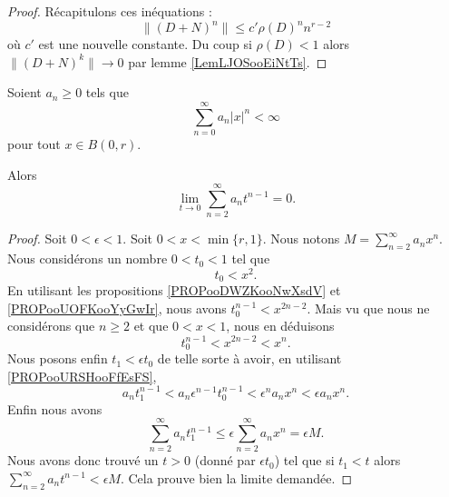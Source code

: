 \begin{proof}
	Récapitulons ces inéquations :
	\begin{equation}
		\| (D+N)^n \|\leq c'\rho(D)^nn^{r-2}
	\end{equation}
	où \( c'\) est une nouvelle constante. Du coup si \( \rho(D)<1\) alors \( \| (D+N)^k \|\to 0\) par lemme \ref{LemLJOSooEiNtTs}.
\end{proof}




\begin{lemma}	\label{LEMooZWXGooQkgsqw}
	Soient \( a_n\geq 0\) tels que
	\begin{equation}
		\sum_{n=0}^{\infty}a_n| x |^n<\infty
	\end{equation}
	pour tout \( x\in B(0,r)\).

	Alors
	\begin{equation}
		\lim_{t\to 0}\sum_{n=2}^{\infty}a_nt^{n-1}=0.
	\end{equation}
\end{lemma}

\begin{proof}
	Soit \( 0<\epsilon<1\). Soit \( 0<x<\min\{ r,1 \}\). Nous notons \(M= \sum_{n=2}^{\infty}a_nx^n\). Nous considérons un nombre \( 0<t_0<1\) tel que
	\begin{equation}
		t_0<x^2.
	\end{equation}
	En utilisant les propositions \ref{PROPooDWZKooNwXsdV} et \ref{PROPooUOFKooYyGwIr}, nous avons \( t_0^{n-1}<x^{2n-2}\). Mais vu que nous ne considérons que \( n\geq 2\) et que \( 0<x<1\), nous en déduisons
	\begin{equation}
		t_0^{n-1}<x^{2n-2}<x^n.
	\end{equation}
	Nous posons enfin \( t_1<\epsilon t_0\) de telle sorte à avoir, en utilisant \ref{PROPooURSHooFfEsFS},
	\begin{equation}
		a_nt_1^{n-1}<a_n\epsilon^{n-1}t_0^{n-1}<\epsilon^na_nx^n<\epsilon a_nx^n.
	\end{equation}
	Enfin nous avons
	\begin{equation}
		\sum_{n=2}^{\infty}a_nt_1^{n-1}\leq \epsilon\sum_{n=2}^{\infty}a_nx^n=\epsilon M.
	\end{equation}
	Nous avons donc trouvé un \( t>0\) (donné par \( \epsilon t_0\)) tel que si \( t_1<t\) alors \( \sum_{n=2}^{\infty}a_nt^{n-1}<\epsilon M\). Cela prouve bien la limite demandée.
\end{proof}



